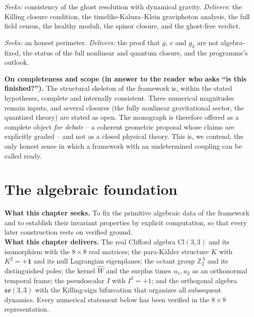 \documentclass[11pt,oneside]{book}
\newcommand{\Wh}{\hat{W}}                         %
\newcommand{\Cl}{\mathrm{Cl}}                     %
\newcommand{\Zt}{\mathbb{Z}_2}
\newcommand{\so}{\mathfrak{so}}
\theoremstyle{plain}
\theoremstyle{definition}
\theoremstyle{remark}
\begin{document}
\begin{description}[leftmargin=0pt,itemsep=4pt]
\item[\textbf{Ch.\,10 -- The $M^6\to M^4$ gravity lift.}] \emph{Seeks:} consistency
of the ghost resolution with dynamical gravity. \emph{Delivers:} the Killing
closure condition, the timelike-Kaluza--Klein graviphoton analysis, the full
field census, the healthy moduli, the spinor closure, and the ghost-free verdict.

\item[\textbf{Ch.\,11 -- Open problems.}] \emph{Seeks:} an honest perimeter.
\emph{Delivers:} the proof that $g$, $v$ and $g_3$ are not algebra-fixed, the
status of the full nonlinear and quantum closure, and the programme's outlook.
\end{description}

\begin{leavesbox}
\textbf{On completeness and scope (in answer to the reader who asks ``is this
finished?'').} The structural skeleton of the framework is, within the stated
hypotheses, complete and internally consistent. Three numerical magnitudes remain
inputs, and several closures (the fully nonlinear gravitational sector, the
quantized theory) are stated as open. The monograph is therefore offered as a
complete object \emph{for debate} -- a coherent geometric proposal whose claims are
explicitly graded -- and not as a closed physical theory. This is, we contend, the
only honest sense in which a framework with an undetermined coupling can be called
ready.
\end{leavesbox}

\chapter{The algebraic foundation}
\label{ch:algebra}

\begin{leavesbox}
\textbf{What this chapter seeks.} To fix the primitive algebraic data of the
framework and to establish their invariant properties by explicit computation, so
that every later construction rests on verified ground.\\[2pt]
\textbf{What this chapter delivers.} The real Clifford algebra $\Cl(3,3)$ and its
isomorphism with the $8\times8$ real matrices; the para-K\"ahler structure $K$
with $K^2=+\mathbf 1$ and its null Lagrangian eigenplanes; the octant group
$\Zt^{\,3}$ and its distinguished poles; the kernel $\Wh$ and the surplus times
$u_1,u_2$ as an orthonormal temporal frame; the pseudoscalar $I$ with $I^2=+1$;
and the orthogonal algebra $\so(3,3)$ with the Killing-sign bifurcation that
organizes all subsequent dynamics. Every numerical statement below has been
verified in the $8\times8$ representation.
\end{leavesbox}
\end{document}
